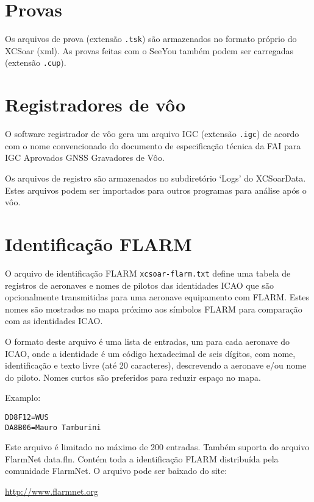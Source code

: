 \section{Provas}

Os arquivos de prova (extensão \verb|.tsk|) são armazenados no formato próprio do XCSoar (xml).  As provas feitas com o SeeYou também podem ser carregadas (extensão \verb|.cup|).

\section{Registradores de vôo} \label{sec:logfiles}

O software registrador de vôo gera um arquivo IGC (extensão  \verb|.igc|) de acordo com o nome convencionado do documento de especificação técnica da FAI para IGC Aprovados GNSS Gravadores de Vôo.

Os arquivos de registro são armazenados no subdiretório ‘Logs’ do XCSoarData.  Estes arquivos podem ser importados para outros programas para análise após o vôo.


\section{Identificação FLARM}\label{sec:flarm-ident-file}

O arquivo de identificação FLARM \verb|xcsoar-flarm.txt| define uma tabela de registros de aeronaves e nomes de pilotos das identidades ICAO que são opcionalmente transmitidas para uma aeronave equipamento com FLARM.  Estes nomes são mostrados no mapa próximo aos símbolos FLARM para comparação com as identidades ICAO.

O formato deste arquivo é uma lista de entradas, um para cada aeronave do ICAO, onde a identidade é um código hexadecimal de seis dígitos, com nome, identificação e texto livre (até 20 caracteres), descrevendo a aeronave e/ou nome do piloto.  Nomes curtos são preferidos para reduzir espaço no mapa.

Examplo:
\begin{verbatim}
DD8F12=WUS
DA8B06=Mauro Tamburini
\end{verbatim}

Este arquivo é limitado no máximo de 200 entradas.  Também suporta do arquivo FlarmNet data.fln.  Contém toda a identificação FLARM distribuída pela comunidade FlarmNet.  O arquivo pode ser baixado do site:

\url{http://www.flarmnet.org}


